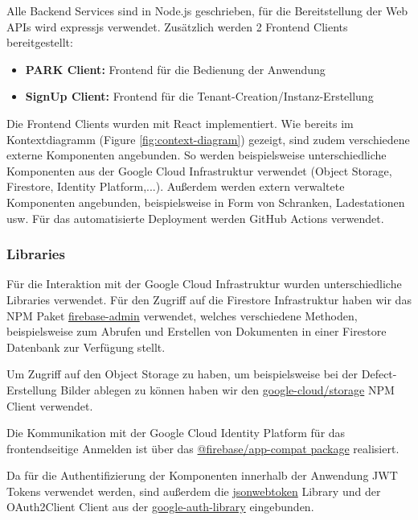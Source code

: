 Alle Backend Services sind in Node.js geschrieben, für die Bereitstellung der Web APIs wird expressjs verwendet.
Zusätzlich werden 2 Frontend Clients bereitgestellt:

\begin{itemize}
    \item \textbf{PARK Client:} Frontend für die Bedienung der Anwendung
    \item \textbf{SignUp Client:} Frontend für die Tenant-Creation/Instanz-Erstellung
\end{itemize}

Die Frontend Clients wurden mit React implementiert. Wie bereits im Kontextdiagramm (Figure \ref{fig:context-diagram}) gezeigt, sind zudem verschiedene externe Komponenten angebunden. So werden beispielsweise unterschiedliche Komponenten aus der Google Cloud Infrastruktur verwendet (Object Storage, Firestore, Identity Platform,...). Außerdem werden extern verwaltete Komponenten angebunden, beispielsweise in Form von Schranken, Ladestationen usw. Für das automatisierte Deployment werden GitHub Actions verwendet.

\subsubsection{Libraries}
Für die Interaktion mit der Google Cloud Infrastruktur wurden unterschiedliche Libraries verwendet. Für den Zugriff auf die Firestore Infrastruktur haben wir das NPM Paket \href{hhttps://www.npmjs.com/package/firebase-admin}{firebase-admin} verwendet, welches verschiedene Methoden, beispielsweise zum Abrufen und Erstellen von Dokumenten in einer Firestore Datenbank zur Verfügung stellt.

Um Zugriff auf den Object Storage zu haben, um beispielsweise bei der Defect-Erstellung Bilder ablegen zu können haben wir den \href{https://www.npmjs.com/package/@google-cloud/storage}{google-cloud/storage} NPM Client verwendet.

Die Kommunikation mit der Google Cloud Identity Platform für das frontendseitige Anmelden ist über das \href{https://www.npmjs.com/package/@firebase/app-compat}{@firebase/app-compat package} realisiert.

Da für die Authentifizierung der Komponenten innerhalb der Anwendung JWT Tokens verwendet werden, sind außerdem die \href{https://www.npmjs.com/package/jsonwebtoken}{jsonwebtoken} Library und der OAuth2Client Client aus der \href{https://www.npmjs.com/package/google-auth-library}{google-auth-library} eingebunden.

